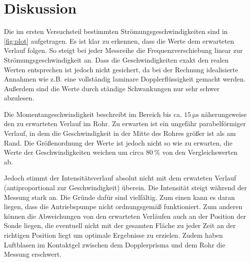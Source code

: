 \section{Diskussion}
\label{sec:Diskussion}
Die im ersten Versuchsteil bestimmten Strömungsgeschwindigkeiten sind in \autoref{fig:plot} aufgetragen.
Es ist klar zu erkennen, dass die Werte dem erwarteten Verlauf folgen.
So steigt bei jeder Messreihe die Frequenzverschiebung linear zur Strömungsgeschwindigkeit an.
Dass die Geschwindigkeiten exakt den realen Werten entsprechen ist jedoch nicht
gesichert, da bei der Rechnung idealisierte Annahmen wie z.B. eine vollständig laminare
Dopplerflüssigkeit gemacht werden. Außerdem sind die Werte durch ständige Schwankungen nur sehr schwer abzulesen.


Die Momentangeschwindigkeit beschreibt im Bereich bis ca. $\qty{15}{\micro\second}$ näherungsweise den zu erwarteten Verlauf im
Rohr. Zu erwarten ist ein ungefähr parabelförmiger Verlauf, in dem die Geschwindigkeit in der Mitte des Rohres größer ist als am Rand.  
Die Größenordnung der Werte ist jedoch nicht so wie zu erwarten, die Werte der Geschwindigkeiten 
weichen um circa $\qty{80}{\percent}$ von den Vergleichswerten ab.

Jedoch stimmt der Intensitätsverlauf absolut nicht mit dem 
erwateten Verlauf (antiproportional zur Geschwindigkeit) überein. Die Intensität steigt während der Messung stark an.
Die Gründe dafür sind vielfältig.
Zum einen kann es daran liegen, dass die Antriebspumpe nicht ordnungsgemäß funktioniert.
Zum anderen können die Abweichungen von den erwarteten Verläufen auch an der Position der Sonde liegen, die eventuell nicht mit der
gesamten Fläche zu jeder Zeit an der richtigen Position liegt um optimale Ergebnisse zu erzielen.
Zudem haben Luftblasen im Kontaktgel zwischen dem Dopplerprisma und dem Rohr die Messung erschwert.